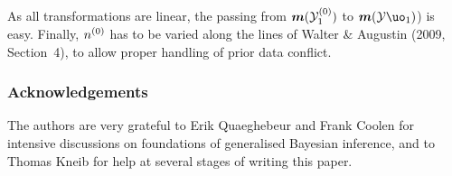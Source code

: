 As all transformations are linear, the passing from $\boldsymbol{m}({\cal Y}^{(0)}_1)$ to $\bs{m}({\cal Y}\uo_1)$) is easy.
Finally, $n^{(0)}$ has to be varied along the lines of Walter \& Augustin (2009, Section~4), to allow proper handling of prior data conflict.
\fi

\subsubsection*{Acknowledgements}

The authors are very grateful to Erik Quaeghebeur and Frank Coolen for intensive discussions on foundations of generalised Bayesian
inference, and to Thomas Kneib for help at several stages of writing this paper.


